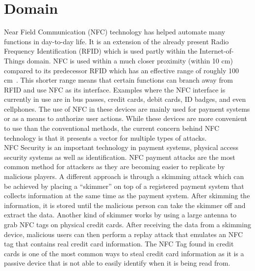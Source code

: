 \section{Domain}

Near Field Communication (NFC) technology has helped automate many functions in day-to-day life. It is an extension of the already present Radio Frequency Identification (RFID) which is used partly within the Internet-of-Things domain. NFC is used within a much closer proximity (within 10 cm) compared to its predecessor RFID which has an effective range of roughly 100 cm~\cite{9213758}. This shorter range means that certain functions can branch away from RFID and use NFC as its interface. Examples where the NFC interface is currently in use are in bus passes, credit cards, debit cards, ID badges, and even cellphones. The use of NFC in these devices are mainly used for payment systems or as a means to authorize user actions. While these devices are more convenient to use than the conventional methods, the current concern behind NFC technology is that it presents a vector for multiple types of attacks.\\

NFC Security is an important technology in payment systems, physical access security systems as well as identification. NFC payment attacks are the most common method for attackers as they are becoming easier to replicate by malicious players. A different approach is through a skimming attack which can be achieved by placing a “skimmer” on top of a registered payment system that collects information at the same time as the payment system. After skimming the information, it is stored until the malicious person can take the skimmer off and extract the data. Another kind of skimmer works by using a large antenna to grab NFC tags on physical credit cards. After receiving the data from a skimming device, malicious users can then perform a replay attack that emulates an NFC tag that contains real credit card information. The NFC Tag found in credit cards is one of the most common ways to steal credit card information as it is a passive device that is not able to easily identify when it is being read from.

